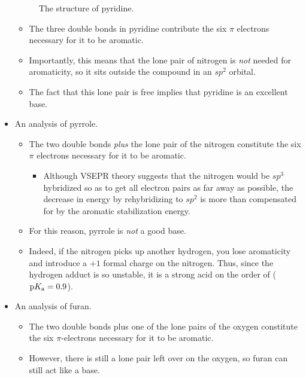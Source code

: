 \documentclass[../notes.tex]{subfiles}
\begin{document}
\begin{itemize}
\begin{figure}[h!]
        \caption{The structure of pyridine.}
        \label{fig:pyridineStructure}
    \end{figure}
    \begin{itemize}
        \item The three double bonds in pyridine contribute the six $\pi$ electrons necessary for it to be aromatic.
        \item Importantly, this means that the lone pair of nitrogen is \emph{not} needed for aromaticity, so it sits outside the compound in an $sp^2$ orbital.
        \item The fact that this lone pair is free implies that pyridine is an excellent base.
    \end{itemize}
    \item An analysis of pyrrole.
    \begin{itemize}
        \item The two double bonds \emph{plus} the lone pair of the nitrogen constitute the six $\pi$ electrons necessary for it to be aromatic.
        \begin{itemize}
            \item Although VSEPR theory suggests that the nitrogen would be $sp^3$ hybridized so as to get all electron pairs as far away as possible, the decrease in energy by rehybridizing to $sp^2$ is more than compensated for by the aromatic stabilization energy.
        \end{itemize}
        \item For this reason, pyrrole is \emph{not} a good base.
        \item Indeed, if the nitrogen picks up another hydrogen, you lose aromaticity and introduce a $+1$ formal charge on the nitrogen. Thus, since the hydrogen adduct is so unstable, it is a strong acid on the order of  ($\text{p}K_\text{a}=0.9$).
    \end{itemize}
    \item An analysis of furan.
    \begin{itemize}
        \item The two double bonds plus one of the lone pairs of the oxygen constitute the six $\pi$-electrons necessary for it to be aromatic.
        \item However, there is still a lone pair left over on the oxygen, so furan can still act like a base.

\end{itemize}
\end{itemize}
\end{document}
